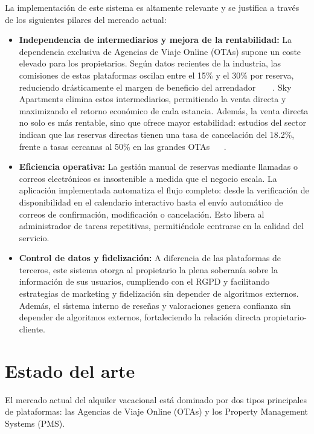 La implementación de este sistema es altamente relevante y se justifica a través de los siguientes pilares del mercado actual:
\begin{itemize}
    \item \textbf{Independencia de intermediarios y mejora de la rentabilidad:} La dependencia exclusiva de Agencias de Viaje Online (OTAs) supone un coste elevado para los propietarios. Según datos recientes de la industria, las comisiones de estas plataformas oscilan entre el 15\% y el 30\% por reserva, reduciendo drásticamente el margen de beneficio del arrendador ~\cite{SmartOrder2025} ~\cite{SiteMinder2025} . Sky Apartments elimina estos intermediarios, permitiendo la venta directa y maximizando el retorno económico de cada estancia. Además, la venta directa no solo es más rentable, sino que ofrece mayor estabilidad: estudios del sector indican que las reservas directas tienen una tasa de cancelación del 18.2\%, frente a tasas cercanas al 50\% en las grandes OTAs ~\cite{DEdge2024} ~\cite{MiraiCancellations2016}.

    \item \textbf{Eficiencia operativa:}  La gestión manual de reservas mediante llamadas o correos electrónicos es insostenible a medida que el negocio escala. La aplicación implementada automatiza el flujo completo: desde la verificación de disponibilidad en el calendario interactivo hasta el envío automático de correos de confirmación, modificación o cancelación. Esto libera al administrador de tareas repetitivas, permitiéndole centrarse en la calidad del servicio.

    \item \textbf{Control de datos y fidelización:} A diferencia de las plataformas de terceros, este sistema otorga al propietario la plena soberanía sobre la información de sus usuarios, cumpliendo con el RGPD y facilitando estrategias de marketing y fidelización sin depender de algoritmos externos. Además, el sistema interno de reseñas y valoraciones genera confianza sin depender de algoritmos externos, fortaleciendo la relación directa propietario-cliente.
\end{itemize}

\section{Estado del arte}
\label{sec:estado_del_arte}
El mercado actual del alquiler vacacional está dominado por dos tipos principales de plataformas: las Agencias de Viaje Online (OTAs) y los Property Management Systems (PMS).

